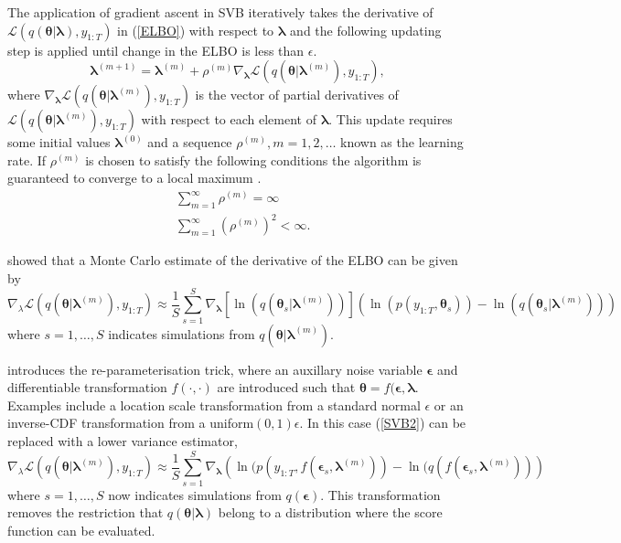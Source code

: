 \documentclass[12pt,a4paper]{article}%
\numberwithin{equation}{section}
\begin{document}
The application of gradient ascent in SVB iteratively takes the derivative of $\mathcal{L}(q(\boldsymbol{\theta} | \boldsymbol{\lambda}), y_{1:T})$ in (\ref{ELBO}) with respect to $\boldsymbol{\lambda}$ and the following updating step is applied until change in the ELBO is less than $\epsilon$.
\begin{equation}
\label{SVB1}
\boldsymbol{\lambda}^{(m+1)} = \boldsymbol{\lambda}^{(m)} + \rho^{(m)} \nabla_{\boldsymbol{\lambda}} \mathcal{L}(q(\boldsymbol{\theta} | \boldsymbol{\lambda}^{(m)}), y_{1:T}),
\end{equation}
where $\nabla_{\boldsymbol{\lambda}}\mathcal{L}(q(\boldsymbol{\theta} | \boldsymbol{\lambda}^{(m)}), y_{1:T})$ is the vector of partial derivatives of $\mathcal{L}(q(\boldsymbol{\theta} | \boldsymbol{\lambda}^{(m)}), y_{1:T})$ with respect to each element of $\boldsymbol{\lambda}$. This update requires some initial values $\boldsymbol{\lambda}^{(0)}$ and a sequence $\rho^{(m)}, m = 1, 2, \dots$ known as the learning rate. If $\rho^{(m)}$ is chosen to satisfy the following conditions the algorithm is guaranteed to converge to a local maximum \citep{Robbins1951}.
\begin{align}
&\sum_{m=1}^{\infty} \rho^{(m)} =  \infty \\
&\sum_{m=1}^{\infty} (\rho^{(m)})^2 <  \infty.
\end{align}

\citet{Ranganath2014} showed that a Monte Carlo estimate of the derivative of the ELBO can be given by
\begin{equation}
\label{SVB2}
\nabla_{\lambda}\mathcal{L}(q(\boldsymbol{\theta} | \boldsymbol{\lambda}^{(m)}), y_{1:T}) \approx \frac{1}{S}\sum_{s=1}^{S} \nabla_{\boldsymbol{\lambda}} [\ln(q(\boldsymbol{\theta}_s | \boldsymbol{\lambda}^{(m)}))] (\ln (p(y_{1:T}, \boldsymbol{\theta}_s)) - \ln(q(\boldsymbol{\theta}_s | \boldsymbol{\lambda}^{(m)})))
\end{equation}
where $s = 1, \dots, S$ indicates simulations from $q(\boldsymbol{\theta} | \boldsymbol{\lambda}^{(m)})$.

\citet{Kingma2014} introduces the re-parameterisation trick, where an auxillary noise variable $\boldsymbol{\epsilon}$ and differentiable transformation $f(\cdot, \cdot)$ are introduced such that $\boldsymbol{\theta} = f(\boldsymbol{\epsilon}, \boldsymbol{\lambda}$. Examples include a location scale transformation from a standard normal $\epsilon$ or an inverse-CDF transformation from a uniform$(0, 1) \epsilon$. In this case (\ref{SVB2}) can be replaced with a lower variance estimator,
\begin{equation}
\label{reparameterise}
\nabla_{\lambda}\mathcal{L}(q(\boldsymbol{\theta} | \boldsymbol{\lambda}^{(m)}), y_{1:T}) \approx \frac{1}{S}\sum_{s=1}^{S} \nabla_{\boldsymbol{\lambda}} \left( \ln (p(y_{1:T}, f(\boldsymbol{\epsilon}_s, \boldsymbol{\lambda}^{(m)})) - \ln(q(f(\boldsymbol{\epsilon}_s, \boldsymbol{\lambda}^{(m)})) \right)
\end{equation}
where $s = 1, \dots, S$ now indicates simulations from $q(\boldsymbol{\epsilon})$. This transformation removes the restriction that $q(\boldsymbol{\theta} | \boldsymbol{\lambda})$ belong to a distribution where the score function can be evaluated.
\end{document}
